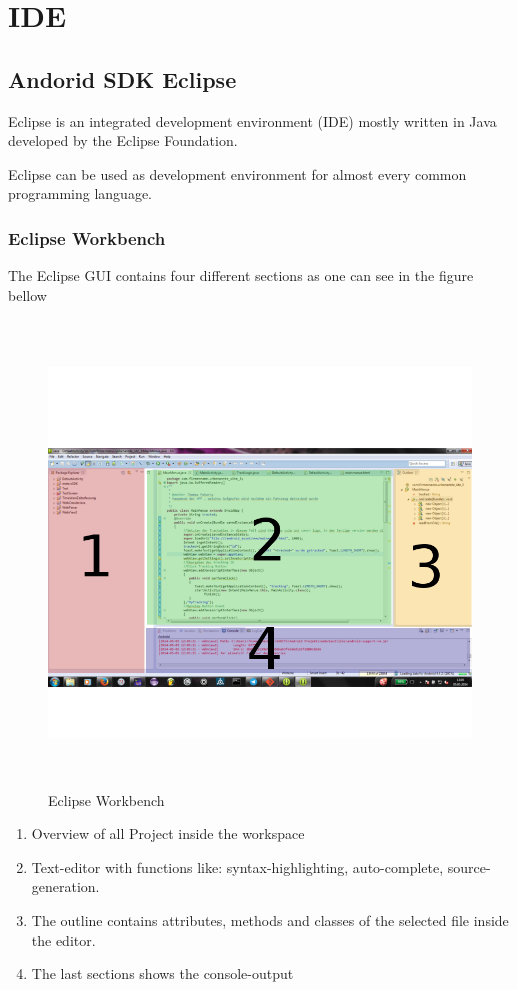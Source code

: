 \chapter{IDE}


\section{Andorid SDK Eclipse}

Eclipse is an integrated development environment (IDE) mostly written in Java developed by the Eclipse Foundation.

Eclipse can be used as development environment for almost every common programming language. 

\subsection{Eclipse Workbench}
The Eclipse GUI contains four different sections as one can see in the figure bellow
\\ 
\begin{figure}[h]
\centering
\includegraphics[width=400pt,height=350pt,keepaspectratio]{graphics/eclipse.png}
\caption{Eclipse Workbench}
\end{figure}

\begin{enumerate}
\item Overview of all Project inside the workspace
\item Text-editor with functions like: syntax-highlighting, auto-complete, source-generation.
\item The outline contains attributes, methods and classes of the selected file inside the editor. 
\item The last sections shows the console-output     
\end{enumerate}

